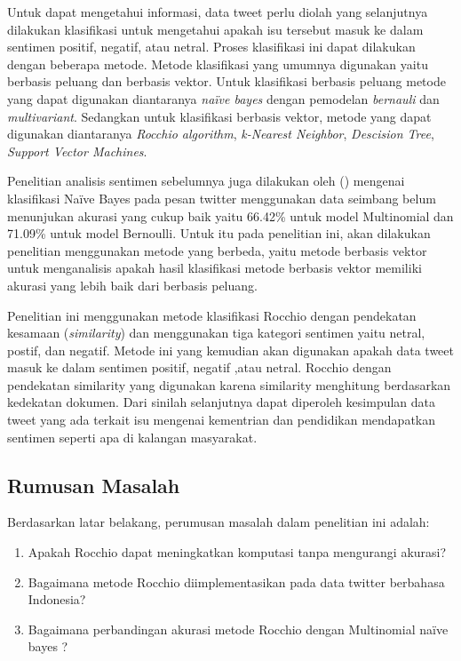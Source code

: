 Untuk dapat mengetahui informasi, data tweet perlu diolah yang selanjutnya dilakukan klasifikasi untuk mengetahui apakah isu tersebut masuk ke dalam sentimen positif, negatif, atau netral. Proses klasifikasi ini dapat dilakukan dengan beberapa metode. Metode klasifikasi yang umumnya digunakan yaitu berbasis peluang dan berbasis vektor. Untuk klasifikasi berbasis peluang metode yang dapat digunakan diantaranya \textit{naïve bayes} dengan pemodelan \textit{bernauli} dan \textit{multivariant}. Sedangkan untuk klasifikasi berbasis vektor, metode yang dapat digunakan diantaranya \textit{Rocchio algorithm}, \textit{k-Nearest Neighbor}, \textit{Descision Tree}, \textit{Support Vector Machines}.

Penelitian analisis sentimen sebelumnya juga dilakukan oleh \cite{ADITYAWAN2014} (\cite*{ADITYAWAN2014}) mengenai klasifikasi Naïve Bayes pada pesan twitter menggunakan data seimbang belum menunjukan akurasi yang cukup baik yaitu 66.42\% untuk model Multinomial dan 71.09\% untuk model Bernoulli. Untuk itu pada penelitian ini, akan dilakukan penelitian menggunakan metode yang berbeda, yaitu metode berbasis vektor untuk menganalisis apakah hasil klasifikasi metode berbasis vektor memiliki akurasi yang lebih baik dari berbasis peluang. 

Penelitian ini menggunakan metode klasifikasi Rocchio dengan pendekatan kesamaan (\textit{similarity}) dan menggunakan tiga kategori sentimen yaitu netral, postif, dan negatif. Metode ini yang kemudian akan digunakan apakah data tweet masuk ke dalam sentimen positif, negatif ,atau netral. Rocchio dengan pendekatan similarity yang digunakan  karena similarity menghitung berdasarkan kedekatan dokumen. Dari sinilah selanjutnya dapat diperoleh kesimpulan data tweet yang ada terkait isu mengenai kementrian dan pendidikan mendapatkan sentimen seperti apa di kalangan masyarakat. 


\subsection*{Rumusan Masalah}
Berdasarkan latar belakang, perumusan masalah dalam penelitian ini adalah: 
\begin{enumerate}[noitemsep] 
	\item Apakah Rocchio dapat meningkatkan komputasi tanpa mengurangi akurasi?
	\item Bagaimana metode Rocchio diimplementasikan pada data twitter berbahasa Indonesia?
	\item Bagaimana perbandingan akurasi metode Rocchio dengan Multinomial naïve bayes ?
\end{enumerate}

